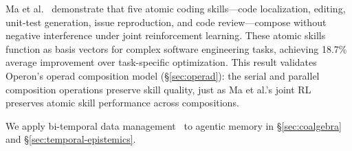 Ma et al.~\cite{ma2026atomic} demonstrate that five atomic coding skills---code localization, editing, unit-test generation, issue reproduction, and code review---compose without negative interference under joint reinforcement learning.  These atomic skills function as basis vectors for complex software engineering tasks, achieving 18.7\% average improvement over task-specific optimization.  This result validates Operon's operad composition model (\S\ref{sec:operad}): the serial and parallel composition operations preserve skill quality, just as Ma et al.'s joint RL preserves atomic skill performance across compositions.

We apply bi-temporal data management~\cite{snodgrass2000temporal, kulkarni2012temporal} to agentic memory in \S\ref{sec:coalgebra} and \S\ref{sec:temporal-epistemics}.
